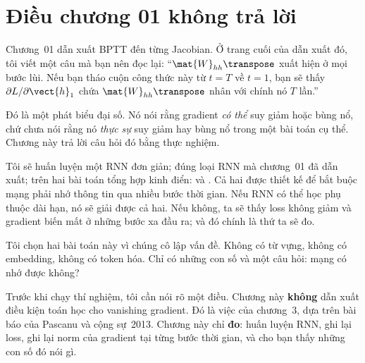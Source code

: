 %

\section{Điều chương 01 không trả lời}
\label{sec:ch02-dat-van-de}

Chương~01 dẫn xuất BPTT đến từng Jacobian. Ở trang cuối của dẫn xuất đó, tôi
viết một câu mà bạn nên đọc lại: ``$\mat{W}_{hh}\transpose$ xuất hiện ở mọi
bước lùi. Nếu bạn tháo cuộn công thức này từ $t = T$ về $t = 1$, bạn sẽ thấy
$\partial L / \partial \vect{h}_1$ chứa $\mat{W}_{hh}\transpose$ nhân với chính
nó $T$ lần.''

Đó là một phát biểu đại số. Nó nói rằng gradient \emph{có thể} suy giảm hoặc
bùng nổ, chứ chưa nói rằng nó \emph{thực sự} suy giảm hay bùng nổ trong một
bài toán cụ thể. Chương này trả lời câu hỏi đó bằng thực nghiệm.

Tôi sẽ huấn luyện một RNN đơn giản; đúng loại RNN mà chương~01 đã dẫn
xuất; trên hai bài toán tổng hợp kinh điển:
 và . Cả
hai được thiết kế để bắt buộc mạng phải nhớ thông tin qua nhiều bước thời
gian. Nếu RNN có thể học phụ thuộc dài hạn, nó sẽ giải được cả hai. Nếu
không, ta sẽ thấy loss không giảm và gradient biến mất ở những bước xa đầu
ra; và đó chính là thứ ta sẽ đo.

Tôi chọn hai bài toán này vì chúng cô lập vấn đề. Không có từ vựng, không có
embedding, không có token hóa. Chỉ có những con số và một câu hỏi: mạng có
nhớ được không?

Trước khi chạy thí nghiệm, tôi cần nói rõ một điều. Chương này \textbf{không}
dẫn xuất điều kiện toán học cho vanishing gradient. Đó là việc của chương~3,
dựa trên bài báo của Pascanu và cộng sự~2013. Chương này chỉ \textbf{đo}:
huấn luyện RNN, ghi lại loss, ghi lại norm của gradient tại từng bước thời
gian, và cho bạn thấy những con số đó nói gì.
